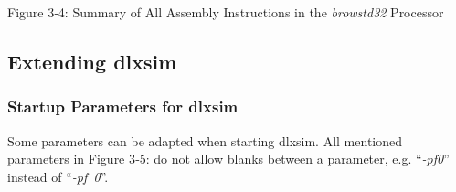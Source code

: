 \documentclass[
]{article}
\begin{document}
Figure 3‑4: Summary of All Assembly Instructions in the \emph{browstd32}
Processor

\hypertarget{extending-dlxsim}{%
\subsection{Extending dlxsim}\label{extending-dlxsim}}

\hypertarget{startup-parameters-for-dlxsim}{%
\subsubsection{Startup Parameters for
dlxsim}\label{startup-parameters-for-dlxsim}}

Some parameters can be adapted when starting dlxsim. All mentioned
parameters in Figure 3‑5: do not allow blanks between a parameter, e.g.
``\emph{-pf0}'' instead of ``\emph{-pf~0}''.
\end{document}
